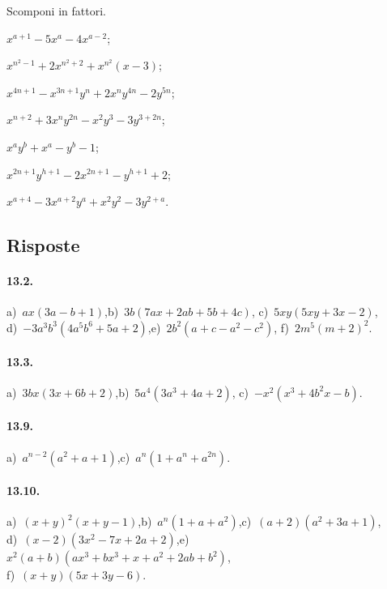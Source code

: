 \begin{esercizio}[\Ast]
 \label{ese:13.120}
 Scomponi in fattori.
 \begin{multicols}{2}
 \begin{enumeratea}
  \item $x^{a+1}-5x^{a}-4x^{a-2}$;
\item $x^{n^{2}-1}+2x^{n^{2}+2}+x^{n^{2}}(x-3)$;
\item $x^{4n+1}-x^{3n+1}y^{n}+2x^{n}y^{4n}-2y^{5n}$;
\item $x^{n+2}+3x^{n}y^{2n}-x^{2}y^{3}-3y^{3+2n}$;
\item $x^{a}y^{b}+x^{a}-y^{b}-1$;
\item $x^{2n+1}y^{h+1}-2x^{2n+1}-y^{h+1}+2$;
\item $x^{a+4}-3x^{a+2}y^{a}+x^{2}y^{2}-3y^{2+a}$.
 \end{enumeratea}
 \end{multicols}
\end{esercizio}
\newpage
\subsection{Risposte}

\paragraph{13.2.}
a)~$ax(3a-b+1)$,\quad b)~$3b(7ax+2ab+5b+4c)$, \quad c)~$5xy(5xy+3x-2)$,\protect\\ d)~$-3a^{3}b^{3}\left(4a^{5}b^{6}+5a+2\right)$,\quad e)~$2b^{2}(a+c-a^{2}-c^{2})$, \quad f)~$2m^{5}\left(m+2\right)^{2}$.

\paragraph{13.3.}
a)~$3bx(3x+6b+2)$,\quad b)~$5a^{4}\left(3a^{3}+4a+2\right)$, \quad c)~$-x^{2}\left(x^{3}+4b^{2}x-b\right)$.

\paragraph{13.9.}
a)~$a^{n-2}\left(a^{2}+a+1\right)$,\quad c)~$a^{n}\left(1+a^{n}+a^{2n}\right)$.

\paragraph{13.10.}
a)~$(x+y)^{2}(x+y-1)$,\quad b)~$a^{n}(1+a+a^{2})$,\quad c)~$(a+2)\left(a^{2}+3a+1\right)$, \protect\\ d)~$(x-2)\left(3x^2-7x+2a+2\right)$,\quad e)~$x^{2}(a+b)(ax^{3}+bx^{3}+x+a^{2}+2ab+b^{2})$,\protect\\ f)~$(x+y)\left(5x+3y-6\right)$.

